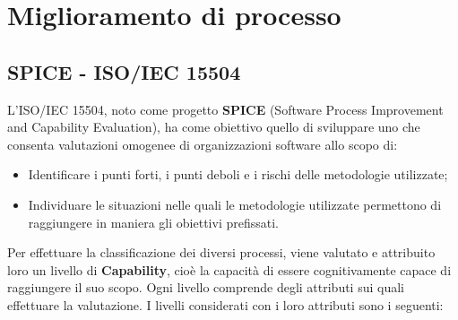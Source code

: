 \appendix
\section{Miglioramento di processo}
\subsection{SPICE - ISO/IEC 15504}  \label{spice}
L'ISO/IEC 15504, noto come progetto \textbf{SPICE} (Software Process Improvement and Capability Evaluation), ha come obiettivo quello di sviluppare uno  che consenta valutazioni omogenee di organizzazioni software allo scopo di:
\begin{itemize}
	\item Identificare i punti forti, i punti deboli e i rischi delle metodologie utilizzate;
	\item Individuare le situazioni nelle quali le metodologie utilizzate permettono di raggiungere in maniera  gli obiettivi prefissati.
\end{itemize}
Per effettuare la classificazione dei diversi processi, viene valutato e attribuito loro un livello di \textbf{Capability}, cioè la capacità di essere cognitivamente capace di raggiungere il suo scopo.
Ogni livello comprende degli attributi sui quali effettuare la valutazione.
I livelli considerati con i loro attributi sono i seguenti:
